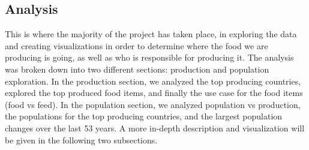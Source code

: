 \documentclass[12pt, a4paper]{article}
\begin{document}
\begin{spacing}{1.1}
	\section{Analysis}
	This is where the majority of the project has taken place, in exploring the data and creating visualizations in order to determine where the food we are producing is going, as well as who is responsible for producing it. The analysis was broken down into two different sections: production and population exploration. In the production section, we analyzed the top producing countries, explored the top produced food items, and finally the use case for the food items (food vs feed). In the population section, we analyzed population vs production, the populations for the top producing countries, and the largest population changes over the last 53 years. A more in-depth description and visualization will be given in the following two subsections. \newpage

	

\end{spacing}
\end{document}
